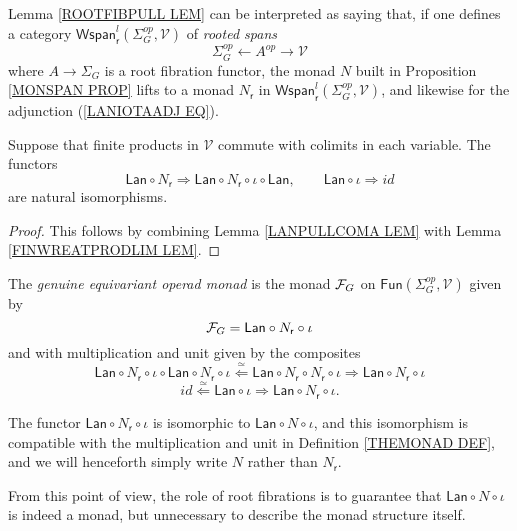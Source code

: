 \documentclass[a4paper,10pt]{article}%
\begin{document}
Lemma \ref{ROOTFIBPULL LEM} can be interpreted as saying that, if one defines a category
$\mathsf{Wspan}^l_{\mathsf{r}}(\Sigma_G^{op},\mathcal{V})$
of \textit{rooted spans}
\[
\Sigma_G^{op} \leftarrow A^{op} \to \mathcal{V}
\]
where $A \to \Sigma_G$ is a root fibration functor, the monad $N$ built in Proposition \ref{MONSPAN PROP} lifts to a monad 
$N_{\mathsf{r}}$ in
$\mathsf{Wspan}^l_{\mathsf{r}}(\Sigma_G^{op},\mathcal{V})$,
and likewise for the adjunction (\ref{LANIOTAADJ EQ}).

\begin{corollary}
Suppose that finite products in $\mathcal{V}$ commute with colimits in each variable.
The functors
\[
	\mathsf{Lan} \circ N_{\mathsf{r}} \Rightarrow
	\mathsf{Lan} \circ N_{\mathsf{r}} \circ \iota \circ \mathsf{Lan},
\qquad
	\mathsf{Lan} \circ \iota \Rightarrow id
\]
are natural isomorphisms.
\end{corollary}

\begin{proof}
This follows by combining Lemma \ref{LANPULLCOMA LEM} with Lemma \ref{FINWREATPRODLIM LEM}.
\end{proof}


\begin{definition}\label{THEMONAD DEF}
The \textit{genuine equivariant operad monad} is the monad
$\mathcal F_G$ on $\mathsf{Fun}(\Sigma_G^{op}, \mathcal{V})$
given by
\[
	\mathcal F_G = \mathsf{Lan} \circ N_{\mathsf{r}} \circ \iota
\]
and with multiplication and unit given by the composites
\[
\mathsf{Lan} \circ N_{\mathsf{r}} \circ \iota \circ
\mathsf{Lan} \circ N_{\mathsf{r}} \circ \iota
\overset{\simeq}{\Leftarrow}
\mathsf{Lan} \circ N_{\mathsf{r}} \circ  N_{\mathsf{r}} \circ \iota
\Rightarrow
\mathsf{Lan} \circ N_{\mathsf{r}} \circ \iota
\]
\[
id \overset{\simeq}{\Leftarrow} \mathsf{Lan} \circ \iota
\Rightarrow
\mathsf{Lan} \circ N_{\mathsf{r}} \circ \iota.
\]
\end{definition}


\begin{remark}
	The functor $\mathsf{Lan} \circ N_{\mathsf{r}} \circ \iota$ is isomorphic to 
	$\mathsf{Lan} \circ N \circ \iota$, and this isomorphism is compatible with the multiplication and unit	in Definition \ref{THEMONAD DEF}, and we will henceforth simply write $N$ rather than $N_{\mathsf{r}}$.
	
	From this point of view, the role of root fibrations is to guarantee that $\mathsf{Lan} \circ N \circ \iota$ is indeed a monad, but unnecessary to describe the monad structure itself.
\end{remark}
\end{document}
